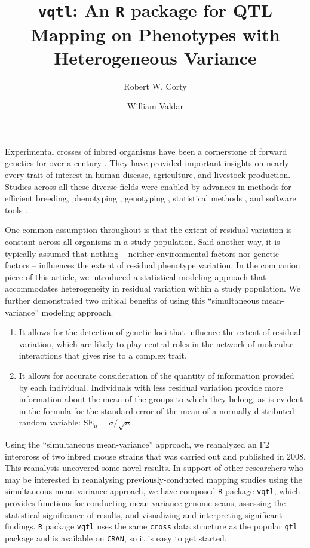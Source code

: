 \documentclass[9pt,twocolumn,twoside]{gsag3jnl}
\title{\texttt{vqtl}: An \texttt{R} package for QTL Mapping on Phenotypes with Heterogeneous Variance}
\author[$\ast$]{Robert W. Corty}
\author[$\ast, 1$]{William Valdar}
\affil[$\ast$]{Department of Genetics, University of North Carolina at Chapel Hill}
\begin{document}
\maketitle
\thispagestyle{firststyle}
\logomark
\articletypemark
\marginmark
\firstpagefootnote
{}
\vspace{-11pt}%

\noindent Experimental crosses of inbred organisms have been a cornerstone of forward genetics for over a century \citep{mendel1866}.
They have provided important insights on nearly every trait of interest in human disease, agriculture, and livestock production.
Studies across all these diverse fields were enabled by advances in methods for efficient breeding, phenotyping \citep{Yang2014a}, genotyping \citep{Williams1990}, statistical methods \citep{Lander1989a}, and software tools \citep{Broman2003}.

One common assumption throughout is that the extent of residual variation is constant across all organisms in a study population.
Said another way, it is typically assumed that nothing -- neither environmental factors nor genetic factors -- influences the extent of residual phenotype variation.
In the companion piece of this article, we introduced a statistical modeling approach that accommodates heterogeneity in residual variation within a study population.
We further demonstrated two critical benefits of using this ``simultaneous mean-variance'' modeling approach.

\begin{enumerate}
	\item It allows for the detection of genetic loci that influence the extent of residual variation, which are likely to play central roles in the network of molecular interactions that gives rise to a complex trait.
	\item It allows for accurate consideration of the quantity of information provided by each individual.  Individuals with less residual variation provide more information about the mean of the groups to which they belong, as is evident in the formula for the standard error of the mean of a normally-distributed random variable: $\text{SE}_\mu = \sigma/\sqrt{n}$.
\end{enumerate}

Using the ``simultaneous mean-variance'' approach, we reanalyzed an F2 intercross of two inbred mouse strains that was carried out and published in 2008.
This reanalysis uncovered some novel results.
In support of other researchers who may be interested in reanalysing previously-conducted mapping studies using the simultaneous mean-variance approach, we have composed \texttt{R} package \texttt{vqtl}, which provides functions for conducting mean-variance genome scans, assessing the statistical significance of results, and visualizing and interpreting significant findings.
\texttt{R} package \texttt{vqtl} uses the same \texttt{cross} data structure as the popular \texttt{qtl} package and is available on \texttt{CRAN}, so it is easy to get started.
\end{document}
